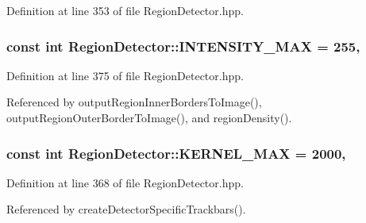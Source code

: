 Definition at line 353 of file Region\-Detector.\-hpp.

\hypertarget{classmultiscale_1_1analysis_1_1RegionDetector_a3b682d43cd686a8bdfce91b0cbbf5245}{
\subsubsection[{I\-N\-T\-E\-N\-S\-I\-T\-Y\-\_\-\-M\-A\-X}]{\setlength{\rightskip}{0pt plus 5cm}const int Region\-Detector\-::\-I\-N\-T\-E\-N\-S\-I\-T\-Y\-\_\-\-M\-A\-X = 255\hspace{0.3cm}{\ttfamily [static]}, {\ttfamily [private]}}}\label{classmultiscale_1_1analysis_1_1RegionDetector_a3b682d43cd686a8bdfce91b0cbbf5245}


Definition at line 375 of file Region\-Detector.\-hpp.



Referenced by output\-Region\-Inner\-Borders\-To\-Image(), output\-Region\-Outer\-Border\-To\-Image(), and region\-Density().

\hypertarget{classmultiscale_1_1analysis_1_1RegionDetector_aa988e3458f774c489e03e3f8bd0db1ed}{
\subsubsection[{K\-E\-R\-N\-E\-L\-\_\-\-M\-A\-X}]{\setlength{\rightskip}{0pt plus 5cm}const int Region\-Detector\-::\-K\-E\-R\-N\-E\-L\-\_\-\-M\-A\-X = 2000\hspace{0.3cm}{\ttfamily [static]}, {\ttfamily [private]}}}\label{classmultiscale_1_1analysis_1_1RegionDetector_aa988e3458f774c489e03e3f8bd0db1ed}


Definition at line 368 of file Region\-Detector.\-hpp.



Referenced by create\-Detector\-Specific\-Trackbars().

